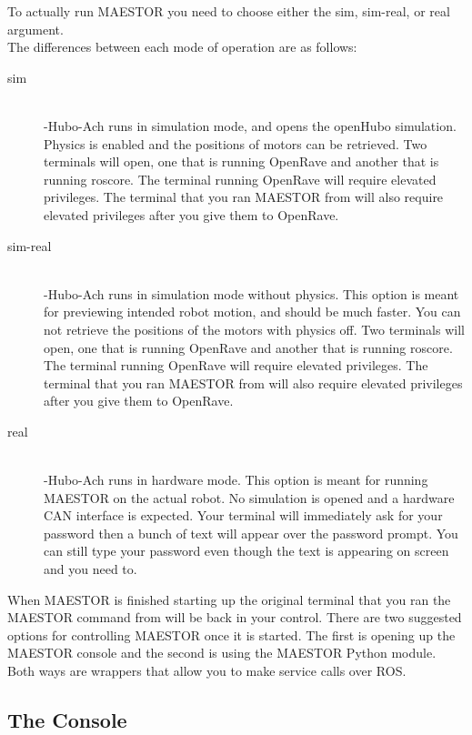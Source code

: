 \documentclass[12pt]{article}
\begin{document}
\noindent To actually run MAESTOR you need to choose either the sim, sim-real, or real argument.\\

\noindent The differences between each mode of operation are as follows:
	\begin{description}
		\item[sim] \hfill \\
		-Hubo-Ach runs in simulation mode, and opens the openHubo simulation. Physics is enabled and the positions of motors can be retrieved. Two terminals will open, one that is running OpenRave and another that is running roscore. The terminal running OpenRave will require elevated privileges. The terminal that you ran MAESTOR from will also require elevated privileges after you give them to OpenRave.
		\item[sim-real] \hfill \\
		-Hubo-Ach runs in simulation mode without physics. This option is meant for previewing intended robot motion, and should be much faster. You can not retrieve the positions of the motors with physics off. Two terminals will open, one that is running OpenRave and another that is running roscore. The terminal running OpenRave will require elevated privileges. The terminal that you ran MAESTOR from will also require elevated privileges after you give them to OpenRave.
		\item[real] \hfill \\ 
		-Hubo-Ach runs in hardware mode. This option is meant for running MAESTOR on the actual robot. No simulation is opened and a hardware CAN interface is expected. Your terminal will immediately ask for your password then a bunch of text will appear over the password prompt. You can still type your password even though the text is appearing on screen and you need to. 
	\end{description}
	
\noindent When MAESTOR is finished starting up the original terminal that you ran the MAESTOR command from will be back in your control. There are two suggested options for controlling MAESTOR once it is started. The first is opening up the MAESTOR console and the second is using the MAESTOR Python module. Both ways are wrappers that allow you to make service calls over ROS. 

\subsection{The Console}
\end{document}
